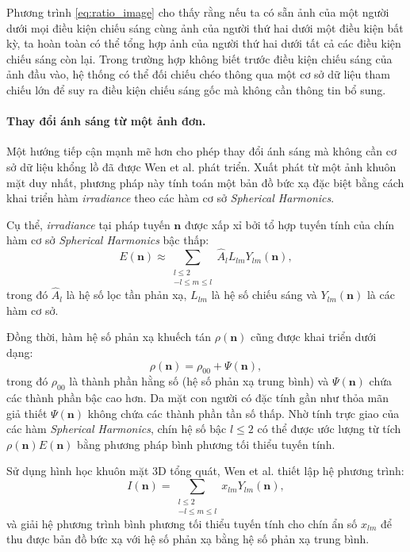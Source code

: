 Phương trình \eqref{eq:ratio_image} cho thấy rằng nếu ta có sẵn ảnh của một người dưới mọi điều kiện chiếu sáng cùng ảnh của người thứ hai dưới một điều kiện bất kỳ, ta hoàn toàn có thể tổng hợp ảnh của người thứ hai dưới tất cả các điều kiện chiếu sáng còn lại. Trong trường hợp không biết trước điều kiện chiếu sáng của ảnh đầu vào, hệ thống có thể đối chiếu chéo thông qua một cơ sở dữ liệu tham chiếu lớn để suy ra điều kiện chiếu sáng gốc mà không cần thông tin bổ sung.

\paragraph{Thay đổi ánh sáng từ một ảnh đơn.}
Một hướng tiếp cận mạnh mẽ hơn cho phép thay đổi ánh sáng mà không cần cơ sở dữ liệu khổng lồ đã được Wen et al. \cite{wen2003face} phát triển. Xuất phát từ một ảnh khuôn mặt duy nhất, phương pháp này tính toán một bản đồ bức xạ đặc biệt bằng cách khai triển hàm \textit{irradiance} theo các hàm cơ sở \textit{Spherical Harmonics}.

Cụ thể, \textit{irradiance} tại pháp tuyến $\mathbf{n}$ được xấp xỉ bởi tổ hợp tuyến tính của chín hàm cơ sở \textit{Spherical Harmonics} bậc thấp:
\begin{equation}
    \label{eq:irradiance_sh}
    E(\mathbf{n}) \approx \sum_{\substack{l \le 2 \\ -l \le m \le l}} \hat{A}_l L_{lm} Y_{lm}(\mathbf{n}),
\end{equation}
trong đó $\hat{A}_l$ là hệ số lọc tần phản xạ, $L_{lm}$ là hệ số chiếu sáng và $Y_{lm}(\mathbf{n})$ là các hàm cơ sở.

Đồng thời, hàm hệ số phản xạ khuếch tán $\rho(\mathbf{n})$ cũng được khai triển dưới dạng:
\begin{equation}
    \label{eq:albedo_expansion}
    \rho(\mathbf{n}) = \rho_{00} + \Psi(\mathbf{n}),
\end{equation}
trong đó $\rho_{00}$ là thành phần hằng số (hệ số phản xạ trung bình) và $\Psi(\mathbf{n})$ chứa các thành phần bậc cao hơn. Da mặt con người có đặc tính gần như thỏa mãn giả thiết $\Psi(\mathbf{n})$ không chứa các thành phần tần số thấp. Nhờ tính trực giao của các hàm \textit{Spherical Harmonics}, chín hệ số bậc $l \le 2$ có thể được ước lượng từ tích $\rho(\mathbf{n})E(\mathbf{n})$ bằng phương pháp bình phương tối thiểu tuyến tính.

Sử dụng hình học khuôn mặt 3D tổng quát, Wen et al. \cite{wen2003face} thiết lập hệ phương trình:
\begin{equation}
    \label{eq:sh_system}
    I(\mathbf{n}) = \sum_{\substack{l \le 2 \\ -l \le m \le l}} x_{lm} Y_{lm}(\mathbf{n}),
\end{equation}
và giải hệ phương trình bình phương tối thiểu tuyến tính cho chín ẩn số $x_{lm}$ để thu được bản đồ bức xạ với hệ số phản xạ bằng hệ số phản xạ trung bình.

